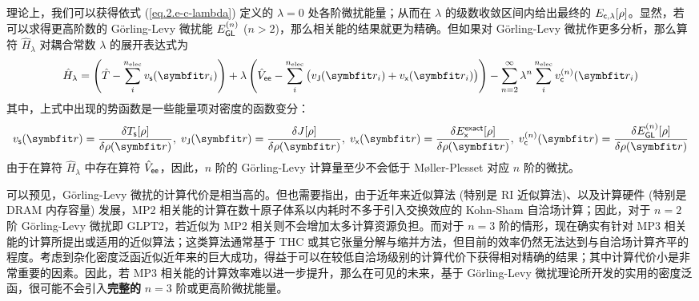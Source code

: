 理论上，我们可以获得依式 (\ref{eq.2.e-c-lambda}) 定义的 $\lambda=0$ 处各阶微扰能量；从而在 $\lambda$ 的级数收敛区间内给出最终的 $E_{\textsf{c}, \lambda} [\rho]$。显然，若可以求得更高阶数的 G\"orling-Levy 微扰能 $E_{\textsf{GL}}^{(n)}$ ($n > 2$)，那么相关能的结果就更为精确。但如果对 G\"orling-Levy 微扰作更多分析，那么算符 $\hat H_\lambda$ 对耦合常数 $\lambda$ 的展开表达式为
\begin{equation}
  \hat H_\lambda = \left( \hat T - \sum_i^{n_\mathrm{elec}} v_\textmt{s} (\bm{r}_i) \right) + \lambda \left( \hat V_\textmt{ee} - \sum_i^{n_\mathrm{elec}} \big( v_\textmt{J} (\bm{r}_i) + v_\textmt{x} (\bm{r}_i) \big) \right) - \sum_{n=2}^\infty \lambda^n \sum_{i}^{n_\mathrm{elec}} v_\textmt{c}^{(n)} (\bm{r}_i)
\end{equation}
其中，上式中出现的势函数是一些能量项对密度的函数变分：
\begin{equation*}
  v_\textmt{s} (\bm{r}) = \frac{\delta T_\textmt{s} [\rho]}{\delta \rho(\bm{r})} , \;
  v_\textmt{J} (\bm{r}) = \frac{\delta J [\rho]}{\delta \rho(\bm{r})}, \;
  v_\textmt{x} (\bm{r}) = \frac{\delta E_\textmt{x}^\textmt{exact} [\rho]}{\delta \rho(\bm{r})}, \;
  v_\textmt{c}^{(n)} (\bm{r}) = \frac{\delta E_\textmt{GL}^{(n)} [\rho]}{\delta \rho (\bm{r})}
\end{equation*}
由于在算符 $\hat H_\lambda$ 中存在算符 $\hat V_{\textsf{ee}}$，因此，$n$ 阶的 G\"orling-Levy 计算量至少不会低于 M\o{}ller-Plesset 对应 $n$ 阶的微扰。

可以预见，G\"orling-Levy 微扰的计算代价是相当高的。但也需要指出，由于近年来近似算法 (特别是 RI 近似算法)、以及计算硬件 (特别是 DRAM 内存容量) 发展，MP2 相关能的计算在数十原子体系以内耗时不多于引入交换效应的 Kohn-Sham 自洽场计算；因此，对于 $n = 2$ 阶 G\"orling-Levy 微扰即 GLPT2，若近似为 MP2 相关则不会增加太多计算资源负担。而对于 $n = 3$ 阶的情形，现在确实有针对 MP3 相关能的计算所提出或适用的近似算法；这类算法通常基于 THC 或其它张量分解与缩并方法\cite{Hohenstein-Martinez.JCP.2012, Parrish-Sherrill.JCP.2012, Lee-Head-Gordon.JCTC.2020, Matthews-Matthews.JCTC.2020}，但目前的效率仍然无法达到与自洽场计算齐平的程度\cite{Matthews-Matthews.JCP.2021}。考虑到杂化密度泛函近似近年来的巨大成功，得益于可以在较低自洽场级别的计算代价下获得相对精确的结果；其中计算代价小是非常重要的因素。因此，若 MP3 相关能的计算效率难以进一步提升，那么在可见的未来，基于 G\"orling-Levy 微扰理论所开发的实用的密度泛函，很可能不会引入\textbf{完整的} $n = 3$ 阶或更高阶微扰能量。

